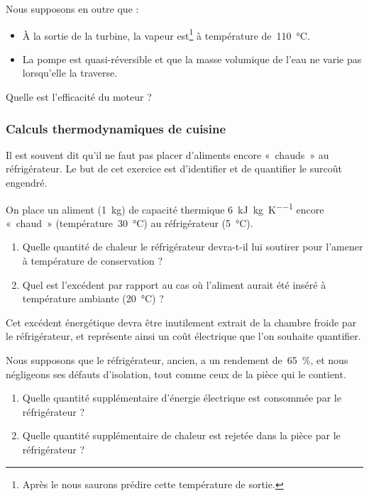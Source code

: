 	Nous supposons en outre que :
		\begin{itemize}
			\item À la sortie de la turbine, la vapeur est\footnote{Après le \courshuit nous saurons prédire cette température de sortie.} à température de~\SI{110}{\degreeCelsius}.
			\item La pompe est quasi-réversible et que la masse volumique de l’eau ne varie pas lorsqu’elle la traverse.
		\end{itemize}
	
	Quelle est l’efficacité du moteur ?

\subsubsection{Calculs thermodynamiques de cuisine}

	Il est souvent dit qu’il ne faut pas placer d’aliments encore «~chauds~» au réfrigérateur. Le but de cet exercice est d’identifier et de quantifier le surcoût engendré.\nopagebreak %
	
	On place un aliment (\SI{1}{\kilogram}) de capacité thermique \SI{6}{\kilo\joule\per\kilogram\per\kelvin} encore «~chaud~» (température~\SI{30}{\celsius}) au réfrigérateur (\SI{5}{\degreeCelsius}).
	
	\begin{enumerate}
		\item Quelle quantité de chaleur le réfrigérateur devra-t-il lui soutirer pour l’amener à température de conservation ?
		\item Quel est l’excédent par rapport au cas où l’aliment aurait été inséré à température ambiante (\SI{20}{\degreeCelsius}) ?
	\end{enumerate}
	
	Cet excédent énergétique devra être inutilement extrait de la chambre froide par le réfrigérateur, et représente ainsi un coût électrique que l’on souhaite quantifier.
	
	Nous supposons que le réfrigérateur, ancien, a un rendement de~\SI{65}{\percent}, et nous négligeons ses défauts d’isolation, tout comme ceux de la pièce qui le contient.
	
	\begin{enumerate}
		\item Quelle quantité supplémentaire d’énergie électrique est consommée par le réfrigérateur ?
		\item Quelle quantité supplémentaire de chaleur est rejetée dans la pièce par le réfrigérateur ?
	\end{enumerate}

